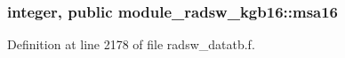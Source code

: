 \subsubsection[{\texorpdfstring{msa16}{msa16}}]{\setlength{\rightskip}{0pt plus 5cm}integer, public module\+\_\+radsw\+\_\+kgb16\+::msa16}\hypertarget{namespacemodule__radsw__kgb16_ad76a9d79e77228ac93ec3db96eed2b29}{}\label{namespacemodule__radsw__kgb16_ad76a9d79e77228ac93ec3db96eed2b29}


Definition at line 2178 of file radsw\+\_\+datatb.\+f.

